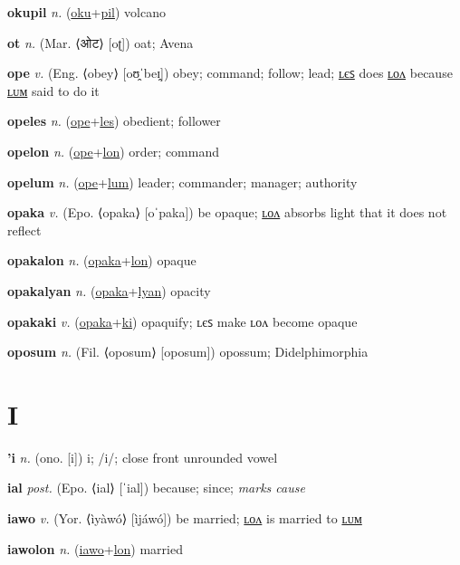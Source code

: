 \textbf{\hypertarget{okupil}{okupil}} \textit{n.} (\hyperlink{oku}{oku}+\allowbreak \hyperlink{pil}{pil})
volcano

\textbf{\hypertarget{ot}{ot}} \textit{n.} (Mar. ⟨{\devanagari{}ओट}⟩ [oʈ])
oat; Avena

\textbf{\hypertarget{ope}{ope}} \textit{v.} (Eng. ⟨obey⟩ [oʊ̯ˈbeɪ̯])
obey; command; follow; lead; \hyperlink{opeles}{ʟєꜱ} does \hyperlink{opelon}{ʟᴏᴧ} because \hyperlink{opelum}{ʟᴜᴍ} said to do it

\textbf{\hypertarget{opeles}{opeles}} \textit{n.} (\hyperlink{ope}{ope}+\allowbreak \hyperlink{les}{les})
obedient; follower

\textbf{\hypertarget{opelon}{opelon}} \textit{n.} (\hyperlink{ope}{ope}+\allowbreak \hyperlink{lon}{lon})
order; command

\textbf{\hypertarget{opelum}{opelum}} \textit{n.} (\hyperlink{ope}{ope}+\allowbreak \hyperlink{lum}{lum})
leader; commander; manager; authority

\textbf{\hypertarget{opaka}{opaka}} \textit{v.} (Epo. ⟨opaka⟩ [oˈpaka])
be opaque; \hyperlink{opakalon}{ʟᴏᴧ} absorbs light that it does not reflect

\textbf{\hypertarget{opakalon}{opakalon}} \textit{n.} (\hyperlink{opaka}{opaka}+\allowbreak \hyperlink{lon}{lon})
opaque

\textbf{\hypertarget{opakalyan}{opakalyan}} \textit{n.} (\hyperlink{opaka}{opaka}+\allowbreak \hyperlink{lyan}{lyan})
opacity

\textbf{\hypertarget{opakaki}{opakaki}} \textit{v.} (\hyperlink{opaka}{opaka}+\allowbreak \hyperlink{ki}{ki})
opaquify; ʟєꜱ make ʟᴏᴧ become opaque

\textbf{\hypertarget{oposum}{oposum}} \textit{n.} (Fil. ⟨oposum⟩ [oposum])
opossum; Didelphimorphia

\section{I}

\textbf{\hypertarget{'i}{'i}} \textit{n.} (ono. [i])
i; /i/; close front unrounded vowel

\textbf{\hypertarget{ial}{ial}} \textit{post.} (Epo. ⟨ial⟩ [ˈial])
because; since; \textit{marks cause}

\textbf{\hypertarget{iawo}{iawo}} \textit{v.} (Yor. ⟨ìyàwó⟩ [ìjáwó])
be married; \hyperlink{iawolon}{ʟᴏᴧ} is married to \hyperlink{iawolum}{ʟᴜᴍ}

\textbf{\hypertarget{iawolon}{iawolon}} \textit{n.} (\hyperlink{iawo}{iawo}+\allowbreak \hyperlink{lon}{lon})
married

